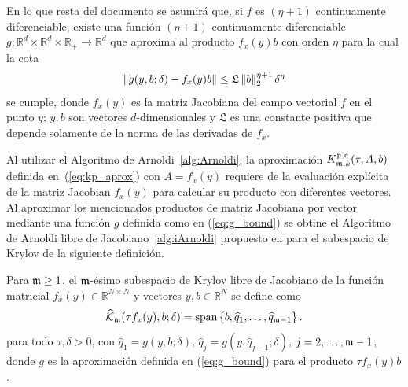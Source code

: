 En lo que resta del documento se asumirá que, si $f$ es $(\eta+1)$  continuamente diferenciable, existe una función $(\eta+1)$ continuamente diferenciable $g: \mathbb{R}^{d}\times \mathbb{R}^{d} \times \mathbb{R}_+ \to \mathbb{R}^{d}$ que aproxima al producto $f_x(y)b$ con orden $\eta$ para la cual la cota
\begin{equation} \label{eq:g_bound}
	\left\lVert g(y,b;\delta)-f_x(y)b \right\rVert \leq \mathfrak{L}\left\lVert b \right\rVert_2^{\eta+1}\delta^{\eta}
\end{equation}
se cumple, donde $f_x(y)$ es la matriz Jacobiana del campo vectorial $f$ en el punto $y$; $y,b$ son vectores $d$-dimensionales y $\mathfrak{L}$ es una constante positiva que depende solamente de la norma de las derivadas de $f_x$.

Al utilizar el Algoritmo de Arnoldi~\ref{alg:Arnoldi}, la aproximación $K_{\mathfrak{m},k}^{\mathfrak{p},\mathfrak{q}}(\tau,A,b)$ definida en~(\ref{eq:kp_aprox}) con $A=f_x(y)$ requiere de la evaluación explícita de la matriz Jacobian $f_x(y)$ para calcular su producto con diferentes vectores. Al aproximar los mencionados productos de matriz Jacobiana por vector mediante una función $g$ definida como en (\ref{eq:g_bound}) se obtine el Algoritmo de Arnoldi libre de Jacobiano~\ref{alg:iArnoldi} propuesto en \cite{brown1987local} para el subespacio de Krylov de la siguiente definición.
\begin{definition}
	\cite{brown1987local} Para $\mathfrak{m}\geq 1$, el $\mathfrak{m}$-ésimo subespacio de Krylov libre de Jacobiano de la función matricial $f_x(y)\in\mathbb{R}^{N\times N}$
	y vectores $y,b\in\mathbb{R}^{N}$ se define como
	\[ \widehat{\mathcal{K}}_{\mathfrak{m}}(\tau f_x(y),b;\delta)=\mathrm{span} \left\{ b,\widehat{q}_1,\ldots,\widehat{q}_{\mathfrak{m}-1} \right\}. \]
	para todo $\tau, \delta > 0$, con $\widehat{q}_1=g(y,b;\delta)$, $\widehat{q}_j=g(y,\widehat{q}_{j-1};\delta)$, $j=2,\ldots,\mathfrak{m}-1$, donde $g$ es la aproximación definida en (\ref{eq:g_bound}) para el producto $\tau f_x(y)b$.
\end{definition}

